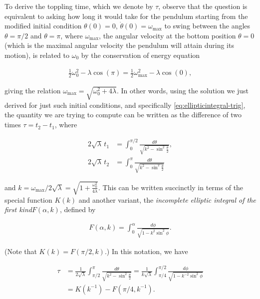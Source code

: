 \documentclass[11pt]{report}
\theoremstyle{plain}
\theoremstyle{definition}
\begin{document}
To derive the toppling time, which we denote by
$\tau$, observe that the question is equivalent to
asking how long it would take for the pendulum
starting from the modified initial condition
$\theta(0)=0$, $\dot{\theta}(0)=\omega_{\textrm{max}}$
to swing between the angles $\theta=\pi/2$ and
$\theta=\pi$, where $\omega_{\textrm{max}}$, the
angular velocity at the bottom position $\theta=0$
(which is the maximal angular velocity the pendulum
will attain during its motion), is related to
$\omega_0$ by the conservation of energy equation

\begin{align*}
\tfrac12 \omega_0^2 - \lambda \cos(\pi) = \tfrac12 \omega_{\textrm{max}}^2 - \lambda \cos(0),
\end{align*}

\noindent giving the relation
$\omega_{\textrm{max}} = \sqrt{\omega_0^2+4\lambda}$.
In other words, using the solution we just derived for
just such initial conditions, and specifically
\eqref{eq:ellipticintegral-trig}, the quantity we are
trying to compute can be written as the difference of
two times $\tau = t_2-t_1$, where

\begin{align*}
2 \sqrt{\lambda}\, t_1 &= \int_0^{\pi/2} \frac{d\theta}{\sqrt{k^2-\sin^2\tfrac{\theta}{2}}}, \\
2 \sqrt{\lambda}\, t_2 &= \int_0^{\pi} \frac{d\theta}{\sqrt{k^2-\sin^2\tfrac{\theta}{2}}}
\end{align*}

\noindent and
$k=\omega_{\textrm{max}}/2\sqrt{\lambda} =
\sqrt{1+\frac{\omega_0^2}{4\lambda}}$.
This can be written succinctly in terms of the special
function $K(k)$ and another variant, the \emph{incomplete
elliptic integral of the first kind}$F(\alpha, k)$,
defined by

\begin{align*}
F(\alpha,k) = \int_0^\alpha \frac{d\phi}{\sqrt{1-k^2 \sin^2 \phi}}.
\end{align*}

\noindent (Note that $K(k)=F(\pi/2,k)$.) In this notation, we
have

\begin{align*}
\tau &= \frac{1}{2\sqrt{\lambda}} \int_{\pi/2}^\pi \frac{d\theta}{\sqrt{k^2-\sin^2 \tfrac{\theta}{2}}}
= \frac{1}{k \sqrt{\lambda}} \int_{\pi/4}^{\pi/2} \frac{d\phi}{\sqrt{1-k^{-2}\sin^2 \phi}} \\ &=
K(k^{-1}) - F(\pi/4,k^{-1}).
\end{align*}
\end{document}
